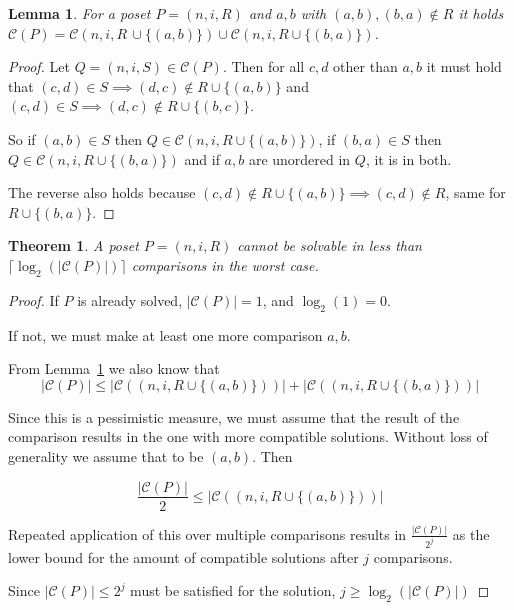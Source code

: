 \documentclass[10pt,journal,compsoc]{IEEEtran}
\newtheorem{theorem}{Theorem}
\newtheorem{lemma}{Lemma}
\begin{document}
\begin{lemma}\label{lemma:compatible_union}
  For a poset $P = (n, i, R)$ and $a, b$ with $(a, b), (b, a)\notin R$ it holds $\mathcal{C}(P) = \mathcal{C}(n, i, R \, \cup \{(a, b)\}) \cup \mathcal{C}(n, i, R\cup \{(b, a)\})$.
\end{lemma}

\begin{proof}
  Let $Q = (n, i, S)\in \mathcal{C}(P)$.
  Then for all $c, d$ other than $a, b$ it must hold that $(c, d)\in S\implies (d,c)\notin R\cup \{(a, b)\}$ and $(c, d)\in S\implies (d, c)\notin R\cup \{(b, c)\}$.

  So if $(a, b)\in S$ then $Q\in\mathcal{C}(n, i, R\cup \{(a, b)\})$, if $(b, a)\in S$ then $Q\in\mathcal{C}(n, i, R\cup \{(b, a)\})$
  and if $a, b$ are unordered in $Q$, it is in both.

  The reverse also holds because $(c, d)\notin R\cup \{(a, b)\}\implies (c, d)\notin R$, same for $R\cup \{(b, a)\}$.
\end{proof}

\begin{theorem}\label{theorem:compatible_log}
  A poset $P=(n,i,R)$ cannot be solvable in less than $\lceil\log_2(|\mathcal{C}(P)|)\rceil$ comparisons in the worst case.
\end{theorem}

\begin{proof}
  If $P$ is already solved, $|\mathcal{C}(P)|=1$, and $\log_2(1)=0$.

  If not, we must make at least one more comparison $a, b$.

  From Lemma~\ref{lemma:compatible_union} we also know that
  $$|\mathcal{C}(P)| \leq |\mathcal{C}((n,i,R\cup \{(a, b)\}))| + |\mathcal{C}((n,i,R\cup \{(b, a)\}))|$$

  Since this is a pessimistic measure, we must assume that the result of the comparison results in the one with more compatible solutions.
  Without loss of generality we assume that to be $(a, b)$.
  Then

  $$\frac{|\mathcal{C}(P)|}{2}\leq |\mathcal{C}((n,i,R\cup \{(a, b)\}))|$$

  Repeated application of this over multiple comparisons results in $\frac{|\mathcal{C}(P)|}{2^j}$ as the lower bound for the amount of compatible solutions after $j$ comparisons.

  Since $|\mathcal{C}(P)|\leq 2^j$ must be satisfied for the solution, $j\geq\log_2(|\mathcal{C}(P)|)$
\end{proof}
\end{document}
